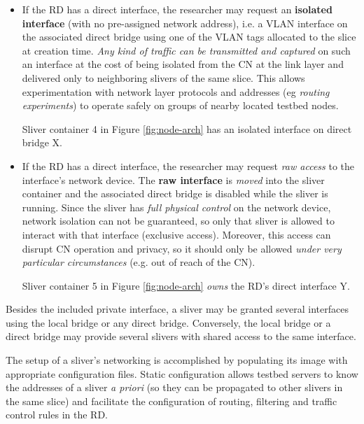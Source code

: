 \documentclass[conference]{IEEEtran}
\begin{document}
\begin{itemize}

\item If the RD has a direct interface, the researcher may request an
  \textbf{isolated interface} (with no pre-assigned network address), i.e. a VLAN interface on the
  associated direct bridge using one of the VLAN tags allocated to the slice
  at creation time.  \emph{Any kind of traffic can be transmitted and
    captured} on such an interface at the cost of being isolated from the CN
  at the link layer and delivered only to neighboring slivers of the same slice.  This allows experimentation with network layer protocols and addresses (eg \emph{routing experiments}) to operate safely
  on groups of nearby located testbed nodes.

  Sliver container 4 in Figure \ref{fig:node-arch} has an isolated interface
  on direct bridge X.

\item If the RD has a direct interface, the researcher may request \emph{raw
  access} to the interface's network device.  The \textbf{raw interface} is
  \emph{moved} into the sliver container and the associated direct bridge is
  disabled while the sliver is running.  Since the sliver has \emph{full
    physical control} on the network device, network isolation can not be
  guaranteed, so only that sliver is allowed to interact with that interface (exclusive access).  Moreover, this
  access can disrupt CN operation and privacy, so it should only be allowed
  \emph{under very particular circumstances} (e.g. out of reach of the CN).

  Sliver container 5 in Figure \ref{fig:node-arch} \emph{owns} the RD's direct
  interface Y.

\end{itemize}

Besides the included private interface, a sliver may be granted several
interfaces using the local bridge or any direct bridge.  Conversely, the local
bridge or a direct bridge may provide several slivers with shared access to
the same interface.

The setup of a sliver's networking is accomplished by populating its image
with appropriate configuration files.  Static configuration allows testbed
servers to know the addresses of a sliver \emph{a priori} (so they can be
propagated to other slivers in the same slice) and facilitate the
configuration of routing, filtering and traffic control rules in the RD.
\end{document}
